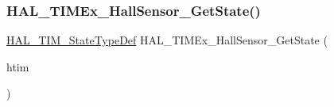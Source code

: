 \subsubsection{\texorpdfstring{H\+A\+L\+\_\+\+T\+I\+M\+Ex\+\_\+\+Hall\+Sensor\+\_\+\+Get\+State()}{HAL\_TIMEx\_HallSensor\_GetState()}}
{\footnotesize\ttfamily \hyperlink{group___t_i_m___exported___types_gae0994cf5970e56ca4903e9151f40010c}{H\+A\+L\+\_\+\+T\+I\+M\+\_\+\+State\+Type\+Def} H\+A\+L\+\_\+\+T\+I\+M\+Ex\+\_\+\+Hall\+Sensor\+\_\+\+Get\+State (\begin{DoxyParamCaption}\item[{\hyperlink{struct_t_i_m___handle_type_def}{T\+I\+M\+\_\+\+Handle\+Type\+Def} $\ast$}]{htim }\end{DoxyParamCaption})}

